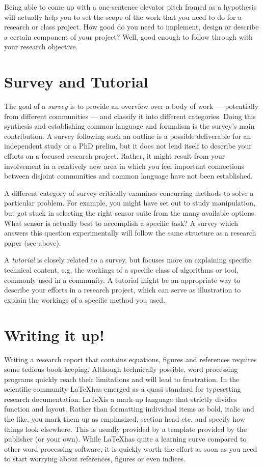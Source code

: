 \documentclass[paper=6.14in:9.21in,pagesize=pdftex,11pt,twoside,openright]{scrbook}
\begin{document}
Being able to come up with a one-sentence elevator pitch framed as a hypothesis will actually help you to set the scope of the work that you need to do for a research or class project. How good do you need to implement, design or describe a certain component of your project? Well, good enough to follow through with your research objective.

\section{Survey and Tutorial}
The goal of a \emph{survey} is to provide an overview over a body of work --- potentially from different communities --- and classify it into different categories. Doing this synthesis and establishing common language and formalism is the survey's main contribution.  A survey following such an outline is a possible deliverable for an independent study or a PhD prelim, but it does not lend itself to describe your efforts on a focused research project. Rather, it might result from your involvement in a relatively new area in which you feel important connections between disjoint communities and common language have not been established.

A different category of survey critically examines concurring methods to solve a particular problem. For example, you might have set out to study manipulation, but got stuck in selecting the right sensor suite from the many available options. What sensor is actually best to accomplish a specific task? A survey which answers this question experimentally will follow the same structure as a research paper (see above).

A \emph{tutorial} is closely related to a survey, but focuses more on explaining specific technical content, e.g, the workings of a specific class of algorithms or tool, commonly used in a community. A tutorial might be an appropriate way to describe your efforts in a research project, which can serve as illustration to explain the workings of a specific method you used.

\section{Writing it up!}
Writing a research report that contains equations, figures and references requires some tedious book-keeping. Although technically possible, word processing programs quickly reach their limitations and will lead to frustration. In the scientific community \LaTeX has emerged as a quasi standard for typesetting research documentation. \LaTeX is a mark-up language that strictly divides function and layout. Rather than formatting individual items as bold, italic and the like, you mark them up as emphasized, section head etc, and specify how things look elsewhere. This is usually provided by a template provided by the publisher (or your own). While \LaTeX has quite a learning curve compared to other word processing software, it is quickly worth the effort as soon as you need to start worrying about references, figures or even indices.
\end{document}
